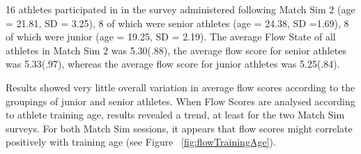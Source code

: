\begin{CJK}{UTF8}{gbsn}
16 athletes participated in in the survey administered following Match Sim 2 (age = 21.81, SD = 3.25), 8 of which were senior athletes (age = 24.38, SD =1.69), 8 of which were junior (age = 19.25, SD = 2.19). The average Flow State of all athletes in Match Sim 2 was 5.30(.88), the average flow score for senior athletes was 5.33(.97), whereas the average flow score for junior athletes was 5.25(.84).

Results showed very little overall variation in average flow scores according to the groupings of junior and senior athletes.  When Flow Scores are analysed according to athlete training age, results revealed a trend, at least for the two Match Sim surveys. For both Match Sim sessions, it appears that flow scores might correlate positively with training age (see Figure ~\ref{fig:flowTrainingAge}).


\end{CJK}
